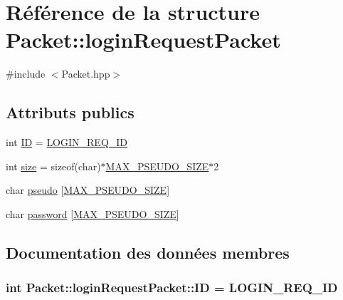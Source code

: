 \hypertarget{structPacket_1_1loginRequestPacket}{}\section{Référence de la structure Packet\+:\+:login\+Request\+Packet}
\label{structPacket_1_1loginRequestPacket}


{\ttfamily \#include $<$Packet.\+hpp$>$}

\subsection*{Attributs publics}
\begin{DoxyCompactItemize}
\item 
int \hyperlink{structPacket_1_1loginRequestPacket_a868cc858137d02dfcec0ab588311881c}{I\+D} = \hyperlink{classPacket_ae91c1d355e4c8f0bef5f893747473661aeadd6545e8dfd8e15000a99a5d8346a1}{L\+O\+G\+I\+N\+\_\+\+R\+E\+Q\+\_\+\+I\+D}
\item 
int \hyperlink{structPacket_1_1loginRequestPacket_ae39055594bd945531dae9e02448dc084}{size} = sizeof(char)$\ast$\hyperlink{Packet_8hpp_a5dc814636bf1234a5bb49481556476d1}{M\+A\+X\+\_\+\+P\+S\+E\+U\+D\+O\+\_\+\+S\+I\+Z\+E}$\ast$2
\item 
char \hyperlink{structPacket_1_1loginRequestPacket_aaa36718e5f1c5d8ac6c13e6065502268}{pseudo} \mbox{[}\hyperlink{Packet_8hpp_a5dc814636bf1234a5bb49481556476d1}{M\+A\+X\+\_\+\+P\+S\+E\+U\+D\+O\+\_\+\+S\+I\+Z\+E}\mbox{]}
\item 
char \hyperlink{structPacket_1_1loginRequestPacket_a85c2b868828d558ac942eadfc8c29523}{password} \mbox{[}\hyperlink{Packet_8hpp_a5dc814636bf1234a5bb49481556476d1}{M\+A\+X\+\_\+\+P\+S\+E\+U\+D\+O\+\_\+\+S\+I\+Z\+E}\mbox{]}
\end{DoxyCompactItemize}


\subsection{Documentation des données membres}
\hypertarget{structPacket_1_1loginRequestPacket_a868cc858137d02dfcec0ab588311881c}{}
\subsubsection[{I\+D}]{\setlength{\rightskip}{0pt plus 5cm}int Packet\+::login\+Request\+Packet\+::\+I\+D = {\bf L\+O\+G\+I\+N\+\_\+\+R\+E\+Q\+\_\+\+I\+D}}\label{structPacket_1_1loginRequestPacket_a868cc858137d02dfcec0ab588311881c}
\hypertarget{structPacket_1_1loginRequestPacket_a85c2b868828d558ac942eadfc8c29523}{}
